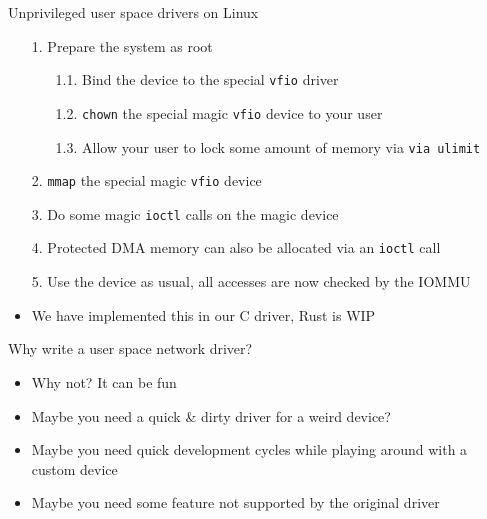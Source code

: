 \documentclass[NET,english,aspectratio=169,notitleframe]{tumbeamer}
\begin{document}
\begin{frame}{Unprivileged user space drivers on Linux}
\begin{itemize}
\item[1.] Prepare the system as root
\begin{itemize}
\item[1.1.] Bind the device to the special \texttt{vfio} driver
\item[1.2.] \texttt{chown} the special magic \texttt{vfio} device to your user
\item[1.3.] Allow your user to lock some amount of memory via \texttt{via ulimit}
\end{itemize}
\pause
\item[2.] \texttt{mmap} the special magic \texttt{vfio} device
\item[3.] Do some magic \texttt{ioctl} calls on the magic device
\item[4.] Protected DMA memory can also be allocated via an \texttt{ioctl} call
\item[5.] Use the device as usual, all accesses are now checked by the IOMMU
\vspace{1em}
\pause
\item We have implemented this in our C driver, Rust is WIP
\end{itemize}
\end{frame}




\begin{frame}{Why write a user space network driver?}
\begin{itemize}
\item Why not? It can be fun
\item Maybe you need a quick \& dirty driver for a weird device?
\item Maybe you need quick development cycles while playing around with a custom device
\item Maybe you need some feature not supported by the original driver
\end{itemize}
\end{frame}
\end{document}
